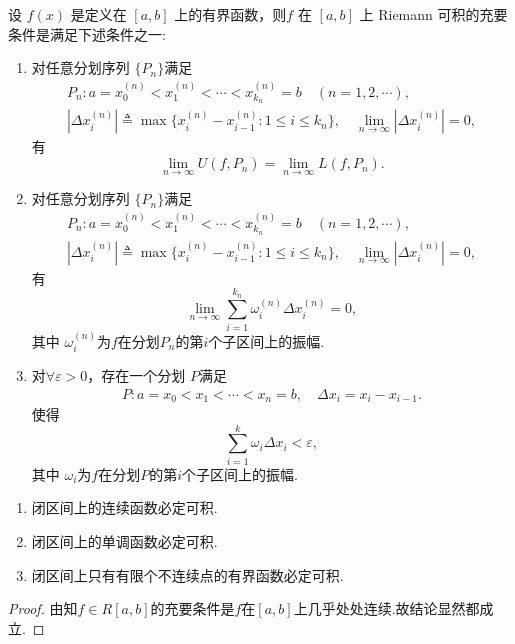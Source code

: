 \documentclass[../../main.tex]{subfiles}%
\begin{document}
\begin{theorem}[Riemann可积的充要条件]\label{theorem:Riemann可积的充要条件}
设 $f(x)$ 是定义在 $[a,b]$ 上的有界函数，则$f$ 在 $[a,b]$ 上 Riemann 可积的充要条件是满足下述条件之一:
\begin{enumerate}
\item 对任意分划序列 $\{P_n\}$满足
\begin{gather*}
P_n : a = x_0^{(n)} < x_1^{(n)} < \cdots < x_{k_n}^{(n)} = b \quad (n = 1,2,\cdots),
\\
|\Delta x_i^{(n)}| \triangleq \max \{ x_i^{(n)} - x_{i - 1}^{(n)} : 1 \leqslant i \leqslant k_n \}, \quad \lim_{n \to \infty} |\Delta x_i^{(n)}| = 0,
\end{gather*}
有
\[
\lim_{n\to\infty} U(f,P_n) = \lim_{n\to\infty} L(f,P_n).
\]

\item 对任意分划序列 $\{P_n\}$满足
\begin{gather*}
P_n : a = x_0^{(n)} < x_1^{(n)} < \cdots < x_{k_n}^{(n)} = b \quad (n = 1,2,\cdots),
\\
|\Delta x_i^{(n)}| \triangleq \max \{ x_i^{(n)} - x_{i - 1}^{(n)} : 1 \leqslant i \leqslant k_n \}, \quad \lim_{n \to \infty} |\Delta x_i^{(n)}| = 0,
\end{gather*}
有
\[
\lim_{n\to\infty} \sum_{i=1}^{k_n} \omega_i^{(n)} \Delta x_i^{(n)} = 0,
\]
其中 $\omega_i^{(n)}$为$f$在分划$P_n$的第$i$个子区间上的振幅.

\item 对$\forall \varepsilon > 0$，存在一个分划 $P$满足
\begin{gather*}
P : a = x_0 < x_1 < \cdots < x_n = b,\quad \Delta x_i=x_i-x_{i-1}.
\end{gather*}
使得
\[
\sum_{i=1}^{k} \omega_i \Delta x_i < \varepsilon,
\]
其中 $\omega_i$为$f$在分划$P$的第$i$个子区间上的振幅.
\end{enumerate}
\end{theorem}

\begin{proposition}[常见的可积函数]\label{proposition:常见的可积函数}
\begin{enumerate}
\item 闭区间上的连续函数必定可积.

\item 闭区间上的单调函数必定可积.

\item 闭区间上只有有限个不连续点的有界函数必定可积.
\end{enumerate}
\end{proposition}
\begin{proof}

由知$f\in R[a,b]$的充要条件是$f$在$[a,b]$上几乎处处连续.故结论显然都成立.
\end{proof}
\end{document}
